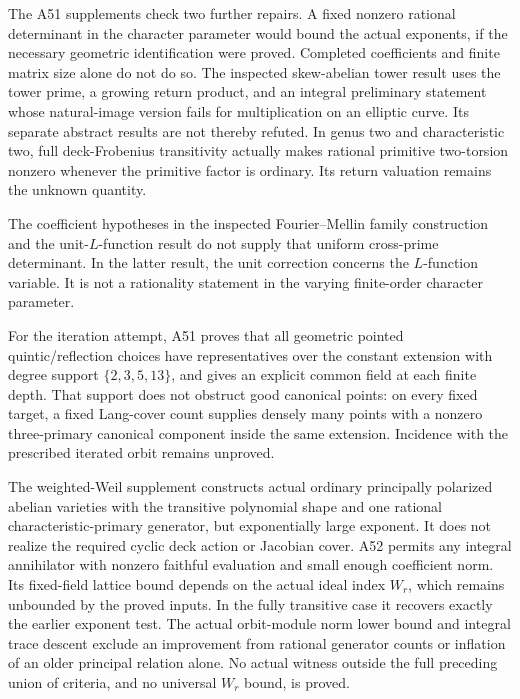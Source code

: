 \documentclass[11pt,a4paper]{article}
\begin{document}
The A51 supplements check two further repairs. A fixed nonzero
rational determinant in the character parameter would bound the actual
exponents, if the necessary geometric identification were proved.
Completed coefficients and finite matrix size alone do not do so.
The inspected skew-abelian tower result uses the tower prime, a growing
return product, and an integral preliminary statement whose natural-image
version fails for multiplication on an elliptic curve. Its separate
abstract results are not thereby refuted. In genus two and characteristic
two, full deck-Frobenius transitivity actually makes rational primitive
two-torsion nonzero whenever the primitive factor is ordinary. Its return
valuation remains the unknown quantity.

The coefficient hypotheses in the inspected Fourier--Mellin family
construction \cite[Theorems~1.3,1.5 and Definition~4.4]{EsnaultKerz2021}
and the unit-$L$-function result
\cite[Corollary~1.8]{EmertonKisin2001} do not supply that uniform
cross-prime determinant. In the latter result, the unit correction concerns
the $L$-function variable. It is not a rationality statement in the
varying finite-order character parameter.

For the iteration attempt, A51 proves that all geometric pointed
quintic/reflection choices have representatives over the constant extension
with degree support $\{2,3,5,13\}$, and gives an explicit common field at
each finite depth. That support does not obstruct good canonical points:
on every fixed target, a fixed Lang-cover count supplies densely many
points with a nonzero three-primary canonical component inside the same
extension. Incidence with the prescribed iterated orbit remains unproved.

The weighted-Weil supplement constructs actual ordinary principally
polarized abelian varieties with the transitive polynomial shape and one
rational characteristic-primary generator, but exponentially large exponent.
It does not realize the required cyclic deck action or Jacobian cover.
A52 permits any integral annihilator with nonzero faithful evaluation and
small enough coefficient norm. Its fixed-field lattice bound depends on
the actual ideal index $W_r$, which remains unbounded by the proved inputs.
In the fully transitive case it recovers exactly the earlier exponent test.
The actual orbit-module norm lower bound and integral trace descent exclude
an improvement from rational generator counts or inflation of an older
principal relation alone. No actual witness outside the full preceding
union of criteria, and no universal $W_r$ bound, is proved.
\end{document}
